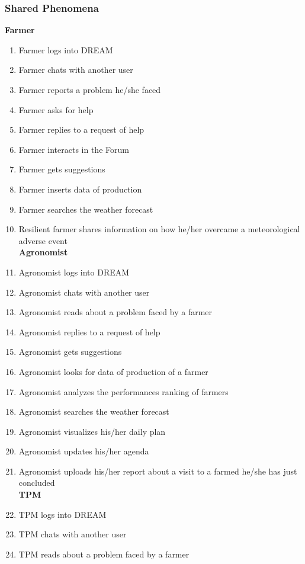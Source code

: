 \subsubsection{Shared Phenomena}
\textbf{Farmer}
\begin{enumerate}[label=\textbf{SP.\arabic*}]
    \item Farmer logs into DREAM
    \item Farmer chats with another user
    \item Farmer reports a problem he/she faced
    \item Farmer asks for help
    \item Farmer replies to a request of help
    \item Farmer interacts in the Forum
    \item Farmer gets suggestions
    \item Farmer inserts data of production
    \item Farmer searches the weather forecast
    \item Resilient farmer shares information on how he/her overcame a meteorological adverse event\newline
    \\
\textbf{Agronomist}
    \item Agronomist logs into DREAM
    \item Agronomist chats with another user
    \item Agronomist reads about a problem faced by a farmer
    \item Agronomist replies to a request of help
    \item Agronomist gets suggestions
    \item Agronomist looks for data of production of a farmer
    \item Agronomist analyzes the performances ranking of farmers
    \item Agronomist searches the weather forecast
    \item Agronomist visualizes his/her daily plan
    \item Agronomist updates his/her agenda
    \item Agronomist uploads his/her report about a visit to a farmed he/she has just concluded\newline
    \\
 \textbf{TPM}
    \item TPM logs into DREAM 
    \item TPM chats with another user
    \item TPM reads about a problem faced by a farmer

\end{enumerate}

